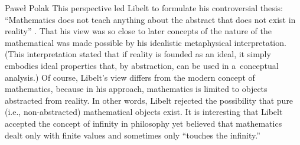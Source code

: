 \begin{artengenv}{Paweł Polak}
This perspective led Libelt to formulate his controversial thesis: ``Mathematics does not teach anything about the abstract that does not exist in reality''
\parencite[][p.65]{libelt_filozofia_1842}. %
 That his view was so close to later concepts of the nature of the mathematical was made possible by his idealistic metaphysical interpretation. (This interpretation stated that if reality is founded as an ideal, it simply embodies ideal properties that, by abstraction, can be used in a~conceptual analysis.) Of course, Libelt's view differs from the modern concept of mathematics, because in his approach, mathematics is limited to objects abstracted from reality. In other words, Libelt rejected the possibility that pure (i.e., non-abstracted) mathematical objects exist. It is interesting that Libelt accepted the concept of infinity in philosophy yet believed that mathematics dealt only with finite values and sometimes only ``touches the infinity.''


\end{artengenv}
